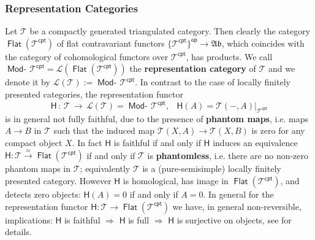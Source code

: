 \documentclass[oneside, a4paper,reqno]{amsart}
\numberwithin{equation}{section}
\theoremstyle{definition}
\begin{document}
\subsubsection{Representation Categories} Let ${\mathcal T}$ be a
compactly generated triangulated category. Then clearly the category
$\operatorname*{\mathsf{Flat}}({\mathcal T}^{\mathsf{cpt}})$ of flat contravariant functors
$\{{\mathcal T}^{\mathsf{cpt}}\}^\operatorname*{\mathsf{op}} {\longrightarrow} {\mathfrak{Ab}}$, which coincides with the category of
cohomological functors over ${\mathcal T}^{\mathsf{cpt}}$, has products. We call
$\operatorname*{\mathsf{Mod}-\!}{\mathcal T}^{\mathsf{cpt}} = \mathcal L(\operatorname*{\mathsf{Flat}}({\mathcal T}^{\mathsf{cpt}}))$ the {\bf
representation category} of ${\mathcal T}$ and we denote it by $\mathcal L({\mathcal T})
:= \operatorname*{\mathsf{Mod}-\!}{\mathcal T}^{\mathsf{cpt}}$. In contrast to the case of locally finitely presented categories,
the representation functor
\[
\mathsf{H} \, \colon \, {\mathcal T} \, {\longrightarrow} \, \mathcal L({\mathcal T}) =
\operatorname*{\mathsf{Mod}-\!}{\mathcal T}^{\mathsf{cpt}}, \,\,\,\,\, \mathsf{H}(A) = {\mathcal T}(-,A)|_{{\mathcal T}^{\mathsf{cpt}}}
\]
is in general not fully faithful, due to the presence of {\bf phantom maps},
i.e. maps $A {\longrightarrow} B$ in ${\mathcal T}$ such that the induced map ${\mathcal T}(X,A) {\longrightarrow}
{\mathcal T}(X,B)$ is zero for any compact object $X$.  In fact $\mathsf{H}$
is faithful if and only if $\mathsf{H}$ induces an equivalence
$\mathsf{H} : {\mathcal T} \stackrel{\approx}{\longrightarrow} \operatorname*{\mathsf{Flat}}({\mathcal T}^{\mathsf{cpt}})$ if and
only if ${\mathcal T}$ is {\bf phantomless}, i.e. there are no non-zero phantom
maps in ${\mathcal T}$; equivalently ${\mathcal T}$ is a (pure-semisimple) locally
finitely presented category. However $\mathsf{H}$ is homological,
has image in $\operatorname*{\mathsf{Flat}}({\mathcal T}^{\mathsf{cpt}})$, and detects zero objects:
$\mathsf{H}(A) = 0$ if and only if $A = 0$. In general for the
representation functor $\mathsf{H} : {\mathcal T} {\longrightarrow} \operatorname*{\mathsf{Flat}}({\mathcal T}^{\mathsf{cpt}})$ we
have, in general non-reversible, implications: $\mathsf{H}$ is
faithful $\Rightarrow$ $\mathsf{H}$ is full $\Rightarrow$
$\mathsf{H}$ is surjective on objects, see \cite{B:3cats} for
details.
\end{document}
